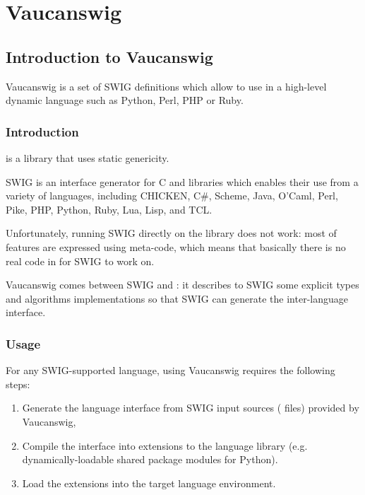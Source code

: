 \chapter{Vaucanswig}
\label{sec:swig}

\section{Introduction to Vaucanswig}

Vaucanswig is a set of SWIG definitions which allow to use \Vauc in a
high-level dynamic language such as Python, Perl, PHP or Ruby.

\subsection{Introduction}

\Vauc is a \Cxx library that uses static genericity.

SWIG is an interface generator for C and \Cxx libraries which enables
their use from a variety of languages, including CHICKEN, C\#, Scheme,
Java, O'Caml, Perl, Pike, PHP, Python, Ruby, Lua, Lisp, and TCL.

Unfortunately, running SWIG directly on the \Vauc library does not
work: most of \Vauc features are expressed using \Cxx meta-code,
which means that basically there is no real code in \Vauc for SWIG
to work on.

Vaucanswig comes between SWIG and \Vauc: it describes to SWIG
some explicit \Vauc types and algorithms implementations so that
SWIG can generate the inter-language interface.

\subsection{Usage}

For  any  SWIG-supported   language,  using  Vaucanswig  requires  the
following steps:

\begin{enumerate}
\item Generate the language interface from SWIG input sources
  ( files) provided by Vaucanswig,

\item Compile the interface into extensions to the language library
  (e.g. dynamically-loadable shared package modules for Python).

\item Load the extensions into the target language environment.
\end{enumerate}

